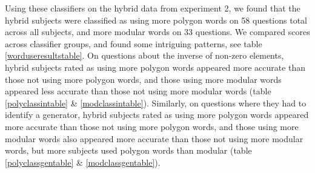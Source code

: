 \documentclass[11pt]{article}
\begin{document}
Using these classifiers on the hybrid data from experiment 2, we found that the hybrid subjects were classified as using more polygon words on 58 questions total across all subjects, and more modular words on 33 questions. We compared scores across classifier groups, and found some intriguing patterns, see table \ref{worduseresultstable}. On questions about the inverse of non-zero elements, hybrid subjects rated as using more polygon words appeared more accurate than those not using more polygon words, and those using more modular words appeared less accurate than those not using more modular words (table \ref{polyclassintable} \& \ref{modclassintable}). Similarly, on questions where they had to identify a generator, hybrid subjects rated as using more polygon words appeared more accurate than those not using more polygon words, and those using more modular words also appeared more accurate than those not using more modular words, but more subjects used polygon words than modular (table \ref{polyclassgentable} \& \ref{modclassgentable}). \\[11pt]
\end{document}
